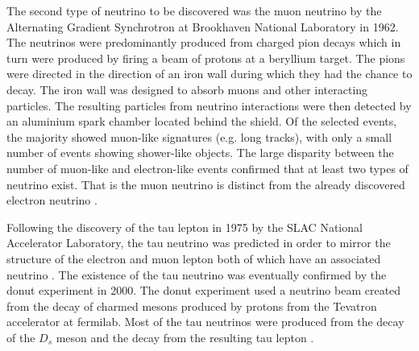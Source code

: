 The second type of neutrino to be discovered was the muon neutrino by the Alternating Gradient Synchrotron at Brookhaven National Laboratory in 1962. The neutrinos were predominantly produced from charged pion decays which in turn were produced by firing a beam of protons at a beryllium target. The pions were directed in the direction of an iron wall during which they had the chance to decay. The iron wall was designed to absorb muons and other interacting particles. The resulting particles from neutrino interactions were then detected by an aluminium spark chamber located behind the shield. Of the selected events, the majority showed muon-like signatures (e.g. long tracks), with only a small number of events showing shower-like objects. The large disparity between the number of muon-like and electron-like events confirmed that at least two types of neutrino exist. That is the muon neutrino is distinct from the already discovered electron neutrino \cite{Muon_neutrino_discovery}. 

Following the discovery of the tau lepton in 1975 by the SLAC National Accelerator Laboratory, the tau neutrino was predicted in order to mirror the structure of the electron and muon lepton both of which have an associated neutrino \cite{tau_lepton_discovery}. The existence of the tau neutrino was eventually confirmed by the \Gls{donut} experiment in 2000. The \Gls{donut} experiment used a neutrino beam created from the decay of charmed mesons produced by protons from the  Tevatron accelerator at \gls{fermilab}. Most of the tau neutrinos were produced from the decay of the $D_s$ meson and the decay from the resulting tau lepton \cite{DONUT}.

